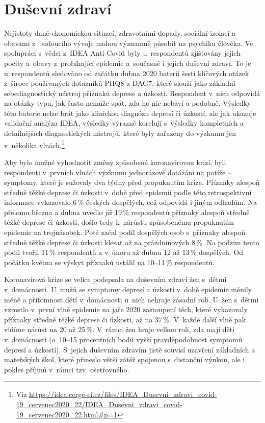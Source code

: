 \section*{Duševní zdraví}
\label{Dusevni_zdravi}

Nejistoty dané ekonomickou situací, zdravotními dopady, sociální izolací a obavami z budoucího vývoje mohou významně působit na psychiku člověka. Ve spolupráci s vědci z~IDEA Anti-Covid byly u~respondentů zjišťovány jejich pocity a obavy z probíhající epidemie a současně i jejich duševní zdraví. To je u~respondentů  sledováno od začátku dubna 2020 baterií šesti klíčových otázek z široce používaných dotazníků PHQ8 a DAG7, které slouží jako základní sebediagnostický nástroj příznaků deprese a úzkosti. Respondent v nich odpovídá na otázky typu, jak často nemůže spát, zda ho nic nebaví a podobně. Výsledky této baterie nelze brát jako klinickou diagnózu depresí či úzkostí, ale jak ukazuje validační analýza IDEA, výsledky výrazně korelují s výsledky kompletních a detailnějších diagnostických nástrojů, které byly zařazeny do výzkumu jen v několika vlnách.\footnote{Viz
\url{https://idea.cerge-ei.cz/files/IDEA\_Dusevni\_zdravi\_covid-19\_cervenec2020\_22/IDEA\_Dusevni\_zdravi\_covid-19\_cervenec2020\_22.html\#p=1}}

Aby bylo možné vyhodnotit změny způsobené koronavirovou krizí, byli respondenti v prvních vlnách výzkumu jednorázově dotázáni na potíže – symptomy, které je sužovaly dva týdny před propuknutím krize. Příznaky alespoň středně těžké deprese či úzkosti v~době před epidemií podle této retrospektivní informace vykazovalo 6\,\% českých dospělých, což odpovídá i jiným odhadům. Na přelomu března a dubna uvedlo již 19\,\% respondentů příznaky alespoň středně těžké deprese či úzkosti, došlo tedy k~nárůstu způsobenému propuknutím epidemie na trojnásobek. Poté začal podíl dospělých osob s příznaky alespoň středně těžké deprese či úzkosti klesat až na prázdninových 8\,\%. Na podzim tento podíl tvořil 11\,\% respondentů a v únoru až dubnu 12 až 13\,\% dospělých. Od počátku května se výskyt příznaků ustálil na 10–11\,\% respondentů.

Koronavirová krize se velice podepsala na duševním zdraví žen s dětmi v~do\-mác\-nos\-ti. U~mužů se symptomy depresí a úzkostí v době epidemie měnily méně a přítomnost dětí v domácnosti u~nich nehraje zásadní roli. U~žen s dětmi vzrostlo v první vlně epidemie na jaře 2020 zastoupení těch, které vykazovaly příznaky středně těžké deprese či úzkosti, až na 37\,\%. V každé další vlně pak vidíme nárůst na 20 až 25\,\%. V rámci žen hraje velkou roli, zda mají děti v domácnosti (o~10--15 procentních bodů vyšší pravděpodobnost symptomů depresí a úzkostí). S jejich duševním zdravím jistě souvisí uzavření základních a mateřských škol, které přineslo větší zátěž spojenou s distanční výukou, ale i pokles příjmů v rámci tzv. ošetřovného.

